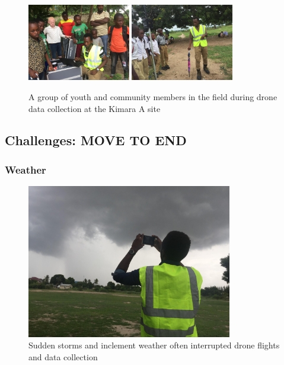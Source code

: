 \documentclass[a4paper,12pt,twoside]{article}
\begin{document}
        \begin{figure} %
            \centering
            \includegraphics[width=0.4\textwidth]{images/image11.jpg}
            \includegraphics[width=0.4\textwidth]{images/image15.jpg}
            \caption{A group of youth and community members in the field during drone data collection at the Kimara A site}
        \end{figure}
        
\subsection{Challenges: MOVE TO END}
    \subsubsection{Weather}
    
        \begin{figure} %
            \centering
            \includegraphics[width=0.8\textwidth]{images/image9.jpg}
            \caption{Sudden storms and inclement weather often interrupted drone flights and data collection}
        \end{figure}
        
\end{document}
